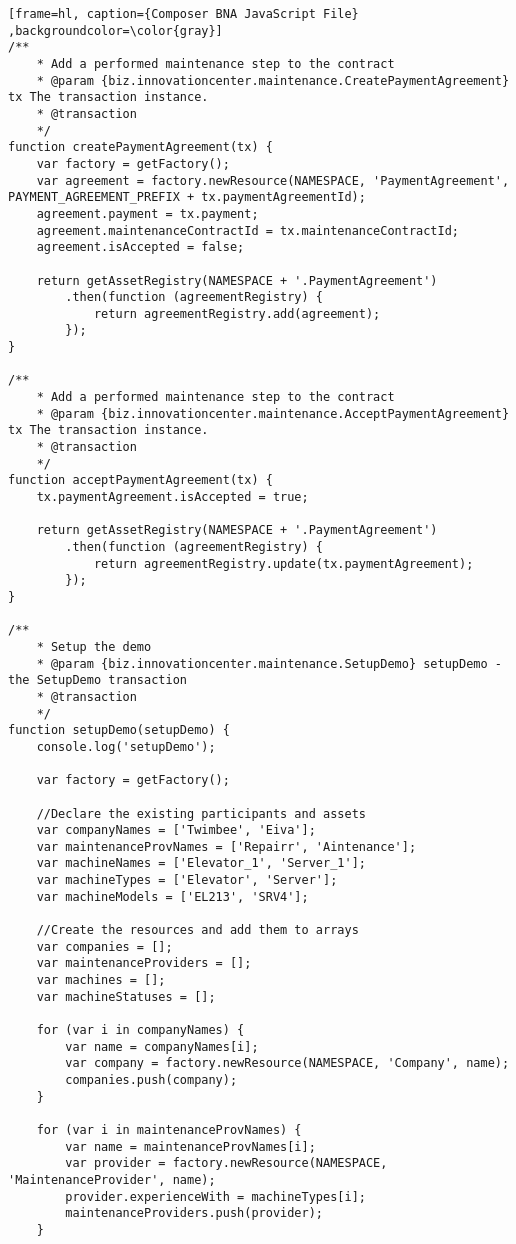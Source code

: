 \begin{appendices}
\begin{lstlisting}[frame=hl, caption={Composer BNA JavaScript File} ,backgroundcolor=\color{gray}]
/**
    * Add a performed maintenance step to the contract
    * @param {biz.innovationcenter.maintenance.CreatePaymentAgreement} tx The transaction instance.
    * @transaction
    */
function createPaymentAgreement(tx) {
    var factory = getFactory();
    var agreement = factory.newResource(NAMESPACE, 'PaymentAgreement', PAYMENT_AGREEMENT_PREFIX + tx.paymentAgreementId);    
    agreement.payment = tx.payment;
    agreement.maintenanceContractId = tx.maintenanceContractId;
    agreement.isAccepted = false;

    return getAssetRegistry(NAMESPACE + '.PaymentAgreement')
        .then(function (agreementRegistry) {
            return agreementRegistry.add(agreement);
        });
}

/**
    * Add a performed maintenance step to the contract
    * @param {biz.innovationcenter.maintenance.AcceptPaymentAgreement} tx The transaction instance.
    * @transaction
    */
function acceptPaymentAgreement(tx) {
    tx.paymentAgreement.isAccepted = true;

    return getAssetRegistry(NAMESPACE + '.PaymentAgreement')
        .then(function (agreementRegistry) {
            return agreementRegistry.update(tx.paymentAgreement);
        });
}

/**
    * Setup the demo
    * @param {biz.innovationcenter.maintenance.SetupDemo} setupDemo - the SetupDemo transaction
    * @transaction
    */
function setupDemo(setupDemo) {
    console.log('setupDemo');

    var factory = getFactory();

    //Declare the existing participants and assets
    var companyNames = ['Twimbee', 'Eiva'];
    var maintenanceProvNames = ['Repairr', 'Aintenance'];
    var machineNames = ['Elevator_1', 'Server_1'];
    var machineTypes = ['Elevator', 'Server'];
    var machineModels = ['EL213', 'SRV4'];

    //Create the resources and add them to arrays
    var companies = [];
    var maintenanceProviders = [];
    var machines = [];
    var machineStatuses = [];

    for (var i in companyNames) {
        var name = companyNames[i];
        var company = factory.newResource(NAMESPACE, 'Company', name);
        companies.push(company);
    }

    for (var i in maintenanceProvNames) {
        var name = maintenanceProvNames[i];
        var provider = factory.newResource(NAMESPACE, 'MaintenanceProvider', name);
        provider.experienceWith = machineTypes[i];
        maintenanceProviders.push(provider);
    }


\end{lstlisting}
\end{appendices}
